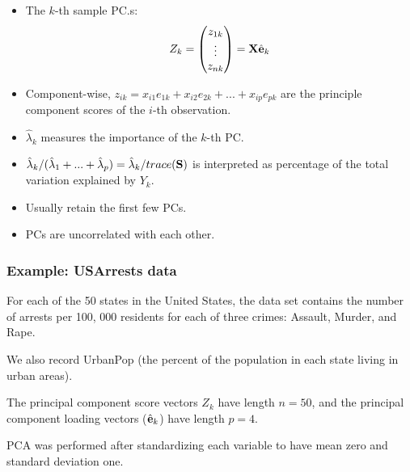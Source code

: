 \documentclass{beamer}
\begin{document}
       		  \begin{frame}
       		  	\frametitle{ }
       		  	\begin{itemize}
       		  		\item  The $k$-th sample PC.s:
       		  		$$Z_k = \begin{pmatrix} z_{1k} \\ \vdots \\ z_{nk}\end{pmatrix} = {\bf X} \hat{\bf e}_k $$
       		  		 \item Component-wise, 
       		  		 $z_{ik} = x_{i1} e_{1k} + x_{i2} e_{2k} + ... + x_{ip} e_{pk}  $
       		  		 are the principle component scores of the $i$-th observation.
       		  		   \item $\hat \lambda_k$ measures the importance of the $k$-th PC.
       		  		\item  $\hat \lambda_k/(\hat \lambda_1 + ... + \hat \lambda_p)=\hat\lambda_k/trace({\bf S})$ is 
       		  		interpreted as percentage of the total variation explained by $Y_k$.
       		  		\item  Usually retain the first few PCs.
       		  		\item PCs are uncorrelated with each other.
       		  		
       		  	\end{itemize}
       		  \end{frame} 
       		  
      
     \begin{frame}
     	\frametitle{ Example: USArrests data}
     	
       For each of the
      50 states in the United States, the data set contains the number of arrests
      per 100, 000 residents for each of three crimes: Assault, Murder, and Rape.
      
      We also record UrbanPop (the percent of the population in each state living
      in urban areas). 
      
      The principal component score vectors $Z_k$ have length $n = 50$,
      and the principal component loading vectors ($\hat{\bf e}_k$) have length $p = 4$.
       
      PCA was
      performed after standardizing each variable to have mean zero and standard
      deviation one.
      
      \end{frame}
    
\end{document}
